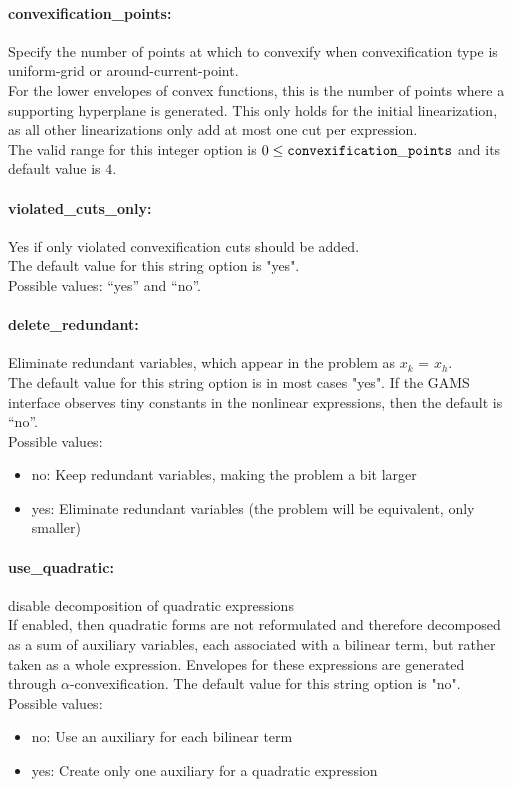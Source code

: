 \paragraph{convexification\_points:}\label{sec:convexification_points} Specify the number of points at which to convexify when convexification type is uniform-grid or around-current-point. $\;$ \\
For the lower envelopes of convex functions, this is the number of points where a supporting hyperplane is generated.
This only holds for the initial linearization, as all other linearizations only add at most one cut per expression.
\\
 The valid range for this integer option is
$0 \le {\tt convexification\_points }$
and its default value is $4$.


\paragraph{violated\_cuts\_only:}\label{sec:violated_cuts_only} Yes if only violated convexification cuts should be added. $\;$ \\
The default value for this string option is "yes".\\
Possible values: ``yes'' and ``no''.

\paragraph{delete\_redundant:}\label{sec:delete_redundant} Eliminate redundant variables, which appear in the problem as $x_k$ = $x_h$. $\;$ \\
The default value for this string option is in most cases "yes".
If the GAMS interface observes tiny constants in the nonlinear expressions, then the default is ``no''.
\\ 
Possible values:
\begin{itemize}
   \item no: Keep redundant variables, making the problem a
bit larger
   \item yes: Eliminate redundant variables (the problem will be equivalent, only smaller)
\end{itemize}

\paragraph{use\_quadratic:}\label{sec:use_quadratic} disable decomposition of quadratic expressions $\;$ \\
If enabled, then quadratic forms are not reformulated and therefore decomposed as a sum of auxiliary variables, each associated with a bilinear term, but rather taken as a whole expression.
Envelopes for these expressions are generated through $\alpha$-convexification.
The default value for this string option is "no".\\ 
Possible values:
\begin{itemize}
   \item no: Use an auxiliary for each bilinear term
   \item yes: Create only one auxiliary for a quadratic expression
\end{itemize}

